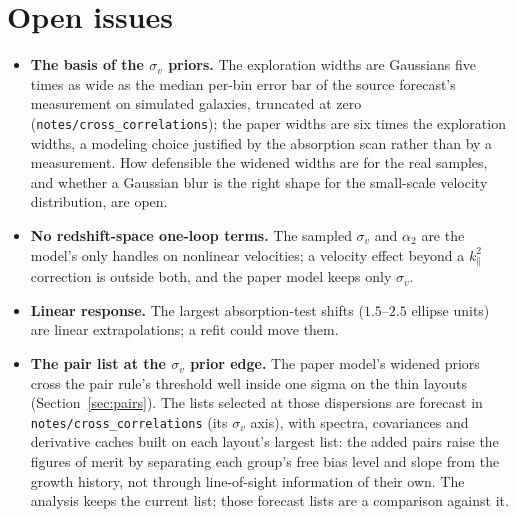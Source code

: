 \documentclass[11pt]{article}
\newcommand{\sv}{\sigma_v}
\newcommand{\us}{\_\allowbreak}
\begin{document}
\section{Open issues}
\label{app:open}

\begin{itemize}
  \item \textbf{The basis of the $\sv$ priors.}  The exploration
    widths are Gaussians five times as wide as the median per-bin
    error bar of the source forecast's measurement on simulated
    galaxies,
    truncated at zero (\texttt{notes/cross\us correlations}); the
    paper widths are six times the exploration widths, a modeling
    choice justified by the absorption scan rather than by a
    measurement.  How defensible the widened widths are for the real
    samples, and whether a Gaussian blur is the right shape for the
    small-scale velocity distribution, are open.
  \item \textbf{No redshift-space one-loop terms.}  The sampled $\sv$
    and $\alpha_2$ are the model's only handles on nonlinear
    velocities; a velocity effect beyond a $k_\parallel^2$ correction
    is outside both, and the paper model keeps only $\sv$.
  \item \textbf{Linear response.}  The largest absorption-test shifts
    ($1.5$--$2.5$ ellipse units) are linear extrapolations; a refit
    could move them.
  \item \textbf{The pair list at the $\sv$ prior edge.}  The paper
    model's widened priors cross the pair rule's threshold well
    inside one sigma on the thin layouts
    (Section~\ref{sec:pairs}).  The lists selected at those
    dispersions are forecast in
    \texttt{notes/cross\us correlations} (its $\sv$ axis), with
    spectra, covariances and derivative caches built on each
    layout's largest list: the added pairs raise the figures of
    merit by separating each group's free bias level and slope from
    the growth history, not through line-of-sight information of
    their own.  The analysis keeps the current list; those forecast
    lists are a comparison against it.
\end{itemize}
\end{document}
